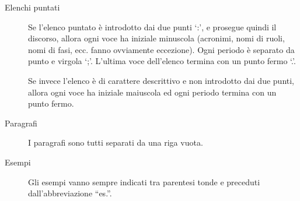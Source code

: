 \documentclass[a4paper, titlepage]{article}
\begin{document}
\begin{description}
	\item[Elenchi puntati] 
	Se l'elenco puntato è introdotto dai due punti `:', e prosegue quindi il discorso, allora ogni voce ha iniziale minuscola (acronimi, nomi di ruoli, nomi di fasi, ecc. fanno ovviamente eccezione). Ogni periodo è separato da punto e virgola `;'. L'ultima voce dell'elenco termina con un punto fermo `.'.
	
	Se invece l'elenco è di carattere descrittivo e non introdotto dai due punti, allora ogni voce ha iniziale maiuscola ed ogni periodo termina con un punto fermo.
	\item[Paragrafi] 
	I paragrafi sono tutti separati da una riga vuota.
	\item[Esempi] 
	Gli esempi vanno sempre indicati tra parentesi tonde e preceduti dall'abbreviazione ``es.''.
\end{description}
\end{document}
